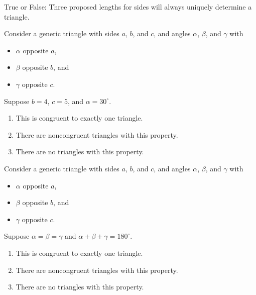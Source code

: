 \documentclass[nooutcomes,noauthor]{ximera}
\author{Bart Snapp}
\begin{document}
\maketitle



\begin{exercise} True or False:  %
  Three proposed lengths for sides will always uniquely determine a
  triangle.
\end{exercise}



\begin{exercise}
  Consider a generic triangle with sides $a$, $b$, and $c$, and angles
  $\alpha$, $\beta$, and $\gamma$ with
  \begin{itemize}
  \item $\alpha$ opposite $a$,
  \item $\beta$ opposite $b$, and
  \item $\gamma$ opposite $c$.
  \end{itemize}
  Suppose $b=4$, $c=5$, and $\alpha = 30^\circ$.
  \begin{enumerate}
  \item This is congruent to exactly one triangle.
  \item There are noncongruent triangles with this property.
  \item There are no triangles with this property.
  \end{enumerate}
\end{exercise}

\begin{exercise}
  Consider a generic triangle with sides $a$, $b$, and $c$, and angles
  $\alpha$, $\beta$, and $\gamma$ with
  \begin{itemize}
  \item $\alpha$ opposite $a$,
  \item $\beta$ opposite $b$, and
  \item $\gamma$ opposite $c$.
  \end{itemize}
  Suppose $\alpha = \beta = \gamma$ and $\alpha+\beta+\gamma =
  180^\circ$.
  \begin{enumerate}
  \item This is congruent to exactly one triangle.
  \item There are noncongruent triangles with this property.
  \item There are no triangles with this property.
  \end{enumerate}
\end{exercise}
\end{document}
